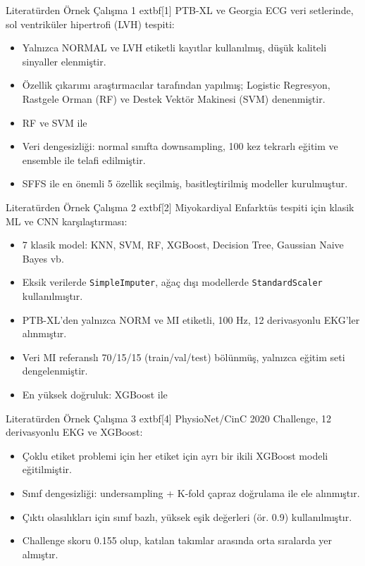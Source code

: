 \documentclass[aspectratio=169]{beamer}
\begin{document}
\begin{frame}{Literatürden Örnek Çalışma 1}
		extbf{[1]} PTB-XL ve Georgia ECG veri setlerinde, sol ventriküler hipertrofi (LVH) tespiti:
	\begin{itemize}
		\item Yalnızca NORMAL ve LVH etiketli kayıtlar kullanılmış, düşük kaliteli sinyaller elenmiştir.
		\item Özellik çıkarımı araştırmacılar tarafından yapılmış; Logistic Regresyon, Rastgele Orman (RF) ve Destek Vektör Makinesi (SVM) denenmiştir.
		\item RF ve SVM ile %
		\item Veri dengesizliği: normal sınıfta downsampling, 100 kez tekrarlı eğitim ve ensemble ile telafi edilmiştir.
		\item SFFS ile en önemli 5 özellik seçilmiş, basitleştirilmiş modeller kurulmuştur.
	\end{itemize}
\end{frame}

\begin{frame}{Literatürden Örnek Çalışma 2}
		extbf{[2]} Miyokardiyal Enfarktüs tespiti için klasik ML ve CNN karşılaştırması:
	\begin{itemize}
		\item 7 klasik model: KNN, SVM, RF, XGBoost, Decision Tree, Gaussian Naive Bayes vb.
		\item Eksik verilerde \texttt{SimpleImputer}, ağaç dışı modellerde \texttt{StandardScaler} kullanılmıştır.
		\item PTB-XL'den yalnızca NORM ve MI etiketli, 100 Hz, 12 derivasyonlu EKG'ler alınmıştır.
		\item Veri MI referanslı 70/15/15 (train/val/test) bölünmüş, yalnızca eğitim seti dengelenmiştir.
		\item En yüksek doğruluk: XGBoost ile %
	\end{itemize}
\end{frame}

\begin{frame}{Literatürden Örnek Çalışma 3}
		extbf{[4]} PhysioNet/CinC 2020 Challenge, 12 derivasyonlu EKG ve XGBoost:
	\begin{itemize}
		\item Çoklu etiket problemi için her etiket için ayrı bir ikili XGBoost modeli eğitilmiştir.
		\item Sınıf dengesizliği: undersampling + K-fold çapraz doğrulama ile ele alınmıştır.
		\item Çıktı olasılıkları için sınıf bazlı, yüksek eşik değerleri (ör. 0.9) kullanılmıştır.
		\item Challenge skoru 0.155 olup, katılan takımlar arasında orta sıralarda yer almıştır.
	\end{itemize}
\end{frame}
\end{document}
